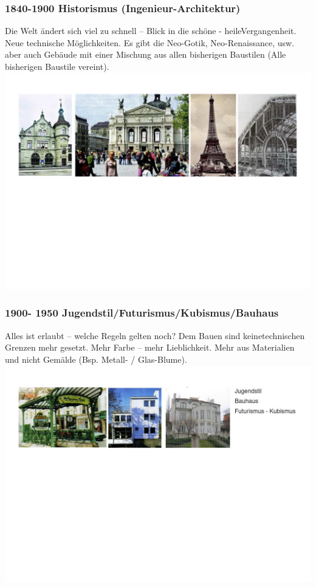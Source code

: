 \documentclass[10pt, openright=true]{scrartcl}
\begin{document}
\subsubsection{1840-1900 Historismus (Ingenieur-Architektur)}
Die Welt ändert sich viel zu schnell – Blick in die \glqq schöne - heile\grqq Vergangenheit. Neue technische Möglichkeiten. Es gibt die Neo-Gotik, Neo-Renaissance, usw. aber auch Gebäude mit einer Mischung aus allen bisherigen Baustilen (Alle bisherigen Baustile vereint).\\
\includegraphics[width=1\textwidth]{images/historismus}
\subsubsection{1900- 1950 Jugendstil/Futurismus/Kubismus/Bauhaus}
Alles ist erlaubt – welche Regeln gelten noch? Dem Bauen sind \glqq keine\grqq technischen Grenzen mehr gesetzt. Mehr Farbe – mehr Lieblichkeit. Mehr aus Materialien und nicht Gemälde (Bsp. Metall- / Glas-Blume). \\
\includegraphics[width=1\textwidth]{images/jugendstil}
\end{document}
